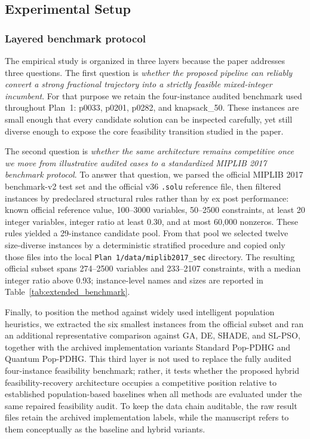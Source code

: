 \subsection{Experimental Setup}
\label{subsec:setup}

\subsubsection{Layered benchmark protocol}

The empirical study is organized in three layers because the paper addresses three questions. The first question is \emph{whether the proposed pipeline can reliably convert a strong fractional trajectory into a strictly feasible mixed-integer incumbent}. For that purpose we retain the four-instance audited benchmark used throughout Plan~1: p0033, p0201, p0282, and knapsack\_50. These instances are small enough that every candidate solution can be inspected carefully, yet still diverse enough to expose the core feasibility transition studied in the paper.

The second question is \emph{whether the same architecture remains competitive once we move from illustrative audited cases to a standardized MIPLIB 2017 benchmark protocol}. To answer that question, we parsed the official MIPLIB 2017 benchmark-v2 test set and the official v36 \texttt{.solu} reference file, then filtered instances by predeclared structural rules rather than by ex post performance: known official reference value, 100--3000 variables, 50--2500 constraints, at least 20 integer variables, integer ratio at least 0.30, and at most 60{,}000 nonzeros. These rules yielded a 29-instance candidate pool. From that pool we selected twelve size-diverse instances by a deterministic stratified procedure and copied only those files into the local \texttt{Plan 1/data/miplib2017\_sec} directory. The resulting official subset spans 274--2500 variables and 233--2107 constraints, with a median integer ratio above 0.93; instance-level names and sizes are reported in Table~\ref{tab:extended_benchmark}.

Finally, to position the method against widely used intelligent population heuristics, we extracted the six smallest instances from the official subset and ran an additional representative comparison against GA, DE, SHADE, and SL-PSO, together with the archived implementation variants Standard Pop-PDHG and Quantum Pop-PDHG. This third layer is not used to replace the fully audited four-instance feasibility benchmark; rather, it tests whether the proposed hybrid feasibility-recovery architecture occupies a competitive position relative to established population-based baselines when all methods are evaluated under the same repaired feasibility audit. To keep the data chain auditable, the raw result files retain the archived implementation labels, while the manuscript refers to them conceptually as the baseline and hybrid variants.

